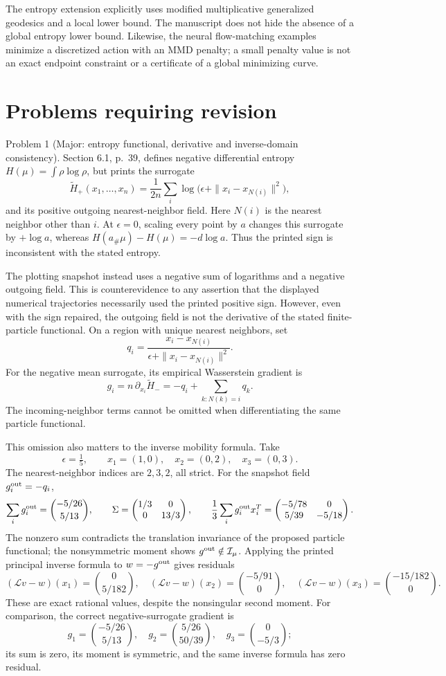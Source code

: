 \documentclass[10pt]{article}
\begin{document}
The entropy extension explicitly uses modified multiplicative generalized geodesics and a local lower bound. The manuscript does not hide the absence of a global entropy lower bound. Likewise, the neural flow-matching examples minimize a discretized action with an MMD penalty; a small penalty value is not an exact endpoint constraint or a certificate of a global minimizing curve.\par
\section*{Problems requiring revision}
Problem 1 (Major: entropy functional, derivative and inverse-domain consistency).  Section 6.1, p. 39, defines negative differential entropy \(H(\mu)=\int\rho\log\rho\), but prints the surrogate \[\widetilde H_+(x_1,\ldots,x_n)
 =\frac1{2n}\sum_i\log\bigl(\epsilon+\|x_i-x_{N(i)}\|^2\bigr),\] and its positive outgoing nearest-neighbor field. Here \(N(i)\) is the nearest neighbor other than \(i\). At \(\epsilon=0\), scaling every point by \(a\) changes this surrogate by \(+\log a\), whereas \(H(a_\#\mu)-H(\mu)=-d\log a\). Thus the printed sign is inconsistent with the stated entropy.\par
The plotting snapshot instead uses a negative sum of logarithms and a negative outgoing field. This is counterevidence to any assertion that the displayed numerical trajectories necessarily used the printed positive sign. However, even with the sign repaired, the outgoing field is not the derivative of the stated finite-particle functional. On a region with unique nearest neighbors, set \[q_i=\frac{x_i-x_{N(i)}}{\epsilon+\|x_i-x_{N(i)}\|^2}.\] For the negative mean surrogate, its empirical Wasserstein gradient is \[g_i=n\,\partial_{x_i}\widetilde H_-
       =-q_i+\sum_{k:N(k)=i}q_k.\] The incoming-neighbor terms cannot be omitted when differentiating the same particle functional.\par
This omission also matters to the inverse mobility formula. Take \[\epsilon=\tfrac15,\qquad x_1=(1,0),\quad x_2=(0,2),\quad x_3=(0,3).\] The nearest-neighbor indices are \(2,3,2\), all strict. For the snapshot field \(g_i^{\rm out}=-q_i\), \[\sum_i g_i^{\rm out}=\binom{-5/26}{5/13},\qquad
 \Sigma=\begin{pmatrix}1/3&0\\0&13/3\end{pmatrix},\qquad
 \frac13\sum_i g_i^{\rm out}x_i^T
 =\begin{pmatrix}-5/78&0\\5/39&-5/18\end{pmatrix}.\] The nonzero sum contradicts the translation invariance of the proposed particle functional; the nonsymmetric moment shows \(g^{\rm out}\notin\mathcal I_\mu\). Applying the printed principal inverse formula to \(w=-g^{\rm out}\) gives residuals \[(\mathcal L v-w)(x_1)=\binom0{5/182},\quad
 (\mathcal L v-w)(x_2)=\binom{-5/91}0,\quad
 (\mathcal L v-w)(x_3)=\binom{-15/182}0.\] These are exact rational values, despite the nonsingular second moment. For comparison, the correct negative-surrogate gradient is \[g_1=\binom{-5/26}{5/13},\quad
 g_2=\binom{5/26}{50/39},\quad
 g_3=\binom0{-5/3};\] its sum is zero, its moment is symmetric, and the same inverse formula has zero residual.\par
\end{document}
